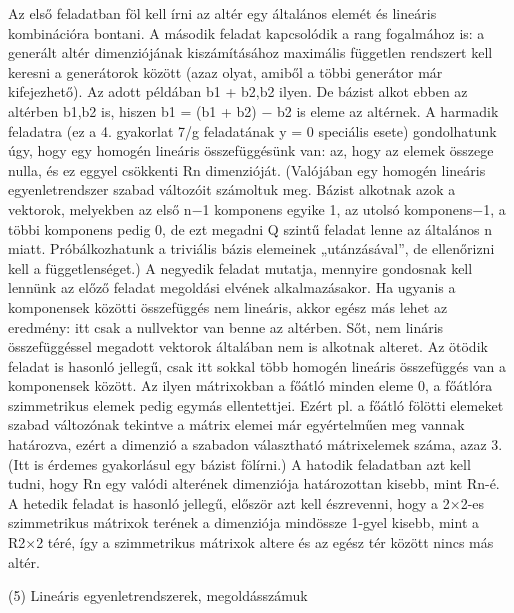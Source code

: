 \begin{frame}
  \begin{tcolorbox}[title={4/7. -Q-}]
Az első feladatban föl kell írni az altér egy általános elemét és lineáris kombinációra bontani. A második feladat kapcsolódik a rang fogalmához is: a generált altér dimenziójának kiszámításához maximális független rendszert kell keresni a generátorok között (azaz olyat, amiből a többi generátor már kifejezhető). Az adott példában {b1 + b2,b2} ilyen. De bázist alkot ebben az altérben {b1,b2} is, hiszen b1 = (b1 + b2) − b2 is eleme az altérnek. A harmadik feladatra (ez a 4. gyakorlat 7/g feladatának y = 0 speciális esete) gondolhatunk úgy, hogy egy homogén lineáris összefüggésünk van: az, hogy az elemek összege nulla, és ez eggyel csökkenti Rn dimenzióját. (Valójában egy homogén lineáris egyenletrendszer szabad változóit számoltuk meg. Bázist alkotnak azok a vektorok, melyekben az első n−1 komponens egyike 1, az utolsó komponens−1, a többi komponens pedig 0, de ezt megadni Q szintű feladat lenne az általános n miatt. Próbálkozhatunk a triviális bázis elemeinek „utánzásával”, de ellenőrizni kell a függetlenséget.) A negyedik feladat mutatja, mennyire gondosnak kell lennünk az előző feladat megoldási elvének alkalmazásakor. Ha ugyanis a komponensek közötti összefüggés nem lineáris, akkor egész más lehet az eredmény: itt csak a nullvektor van benne az altérben. Sőt, nem lináris összefüggéssel megadott vektorok általában nem is alkotnak alteret. Az ötödik feladat is hasonló jellegű, csak itt sokkal több homogén lineáris összefüggés van a komponensek között. Az ilyen mátrixokban a főátló minden eleme 0, a főátlóra szimmetrikus elemek pedig egymás ellentettjei. Ezért pl. a főátló fölötti elemeket szabad változónak tekintve a mátrix elemei már egyértelműen meg vannak határozva, ezért a dimenzió a szabadon választható mátrixelemek száma, azaz 3. (Itt is érdemes gyakorlásul egy bázist fölírni.) A hatodik feladatban azt kell tudni, hogy Rn egy valódi alterének dimenziója határozottan kisebb, mint Rn-é. A hetedik feladat is hasonló jellegű, először azt kell észrevenni, hogy a 2×2-es szimmetrikus mátrixok terének a dimenziója mindössze 1-gyel kisebb, mint a R2×2 téré, így a szimmetrikus mátrixok altere és az egész tér között nincs más altér.
  \end{tcolorbox}
\end{frame}



\begin{frame}[plain]
\begin{tcolorbox}[center, colback={myyellow}, coltext={black}, colframe={myyellow}]
    {\RHuge  (5) Lineáris egyenletrendszerek, megoldásszámuk}
    \mmedskip
\end{tcolorbox}
\end{frame}


